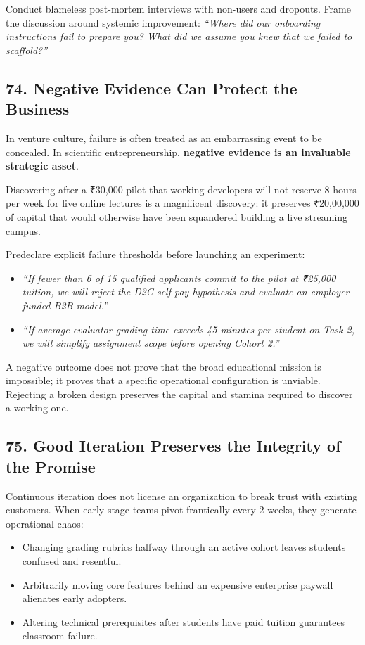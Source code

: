 Conduct blameless post-mortem interviews with non-users and dropouts. Frame the discussion around systemic improvement: \emph{``Where did our onboarding instructions fail to prepare you? What did we assume you knew that we failed to scaffold?''}

\subsection*{74. Negative Evidence Can Protect the Business}

In venture culture, failure is often treated as an embarrassing event to be concealed. In scientific entrepreneurship, \textbf{negative evidence is an invaluable strategic asset}.

Discovering after a ₹30,000 pilot that working developers will not reserve 8 hours per week for live online lectures is a magnificent discovery: it preserves ₹20,00,000 of capital that would otherwise have been squandered building a live streaming campus.

Predeclare explicit failure thresholds before launching an experiment:
\begin{itemize}
    \item \emph{``If fewer than 6 of 15 qualified applicants commit to the pilot at ₹25,000 tuition, we will reject the D2C self-pay hypothesis and evaluate an employer-funded B2B model.''}
    \item \emph{``If average evaluator grading time exceeds 45 minutes per student on Task 2, we will simplify assignment scope before opening Cohort 2.''}
\end{itemize}

A negative outcome does not prove that the broad educational mission is impossible; it proves that a specific operational configuration is unviable. Rejecting a broken design preserves the capital and stamina required to discover a working one.

\subsection*{75. Good Iteration Preserves the Integrity of the Promise}

Continuous iteration does not license an organization to break trust with existing customers. When early-stage teams pivot frantically every 2 weeks, they generate operational chaos:
\begin{itemize}
    \item Changing grading rubrics halfway through an active cohort leaves students confused and resentful.
    \item Arbitrarily moving core features behind an expensive enterprise paywall alienates early adopters.
    \item Altering technical prerequisites after students have paid tuition guarantees classroom failure.
\end{itemize}

